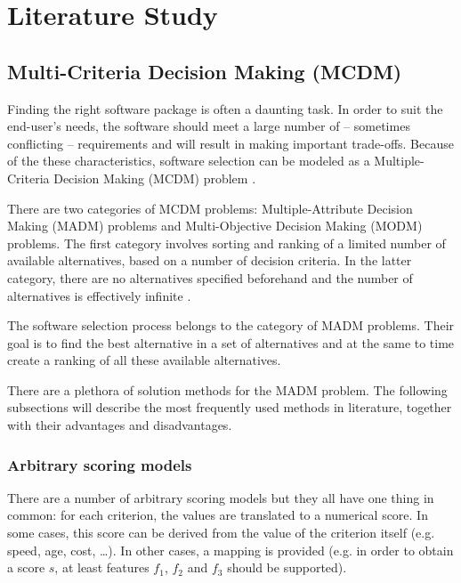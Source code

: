 \chapter{Literature Study}
\label{chap:literature}


\section{Multi-Criteria Decision Making (MCDM)}
\label{sec:mcdm}

Finding the right software package is often a daunting task. In order to suit the end-user's needs, the software should meet a large number of -- sometimes conflicting -- requirements and will result in making important trade-offs. Because of the these characteristics, software selection can be modeled as a Multiple-Criteria Decision Making (MCDM) problem \cite{Jadhav:2009, Jadhav:2011}.

There are two categories of MCDM problems: Multiple-Attribute Decision Making (MADM) problems and Multi-Objective Decision Making (MODM) problems. The first category involves sorting and ranking of a limited number of available alternatives, based on a number of decision criteria. In the latter category, there are no alternatives specified beforehand and the number of alternatives is effectively infinite \cite{Kahraman:2008}. 

The software selection process belongs to the category of MADM problems. Their goal is to find the best alternative in a set of alternatives and at the same to time create a ranking of all these available alternatives. %

There are a plethora of solution methods for the MADM problem. The following subsections will describe the most frequently used methods in literature, together with their advantages and disadvantages. 

\subsection{Arbitrary scoring models} %

There are a number of arbitrary scoring models but they all have one thing in common: for each criterion, the values are translated to a numerical score. In some cases, this score can be derived from the value of the criterion itself (e.g. speed, age, cost, \ldots). In other cases, a mapping is provided (e.g. in order to obtain a score $s$, at least features $f_1$, $f_2$ and $f_3$ should be supported).

